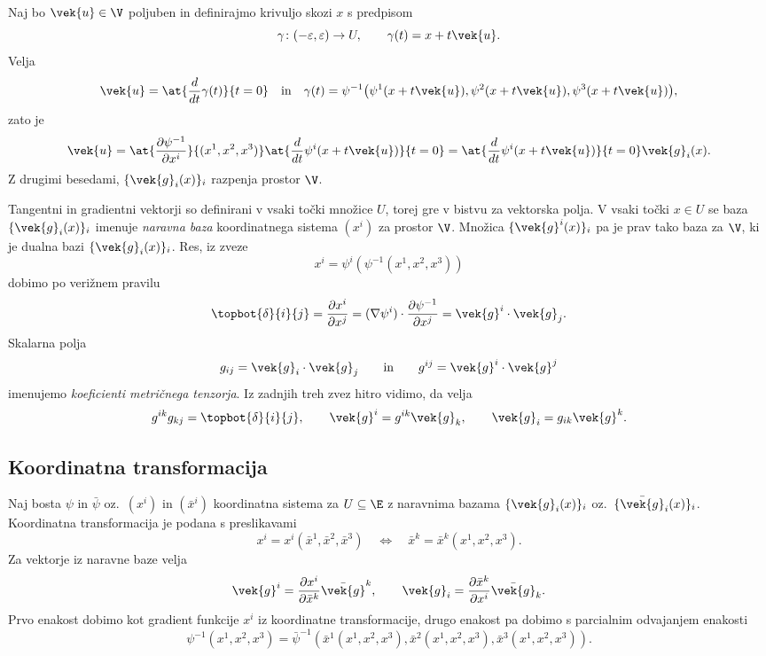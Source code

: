 \proof
	Naj bo $\vek{u}\in\V$ poljuben in definirajmo krivuljo skozi $x$ s predpisom
	\[ \gamma\colon(-\varepsilon,\varepsilon)\to U,\qquad \gamma(t)=x+t\vek{u}. \]
	Velja
	\[
		\vek{u}=\at{\frac{d}{dt}\gamma(t)}{t=0}\quad\textrm{in}\quad
		\gamma(t)=\psi^{-1}\big(\psi^1(x+t\vek{u}),\psi^2(x+t\vek{u}),\psi^3(x+t\vek{u})\big),
	\]
	zato je
	\[
		\vek{u}=
		\at{\frac{\partial\psi^{-1}}{\partial x^i}}{(x^1,x^2,x^3)}
		\at{\frac{d}{dt}\psi^i(x+t\vek{u})}{t=0}=
		\at{\frac{d}{dt}\psi^i(x+t\vek{u})}{t=0}\vek{g}_i(x).
	\]
	Z drugimi besedami, $\{\vek{g}_i(x)\}_{i}$ razpenja prostor $\V$.
\endproof

Tangentni in gradientni vektorji so definirani v vsaki točki množice $U$, torej
gre v bistvu za vektorska polja. V vsaki točki $x\in U$ se baza $\{\vek{g}_i(x)\}_i$
imenuje \emph{naravna baza} koordinatnega sistema $(x^i)$ za prostor $\V$.
Množica $\{\vek{g}^i(x)\}_i$ pa je prav tako baza za $\V$, ki je dualna bazi $\{\vek{g}_i(x)\}_i$.
Res, iz zveze
\[ x^i=\psi^i(\psi^{-1}(x^1,x^2,x^3)) \]
dobimo po verižnem pravilu
\begin{equation} \label{e:gigj}
	\topbot{\delta}{i}{j}=\frac{\partial x^i}{\partial x^j}=
	(\nabla\psi^i)\cdot\frac{\partial\psi^{-1}}{\partial x^j}=\vek{g}^i\cdot\vek{g}_j.
\end{equation}
Skalarna polja
\[ g_{ij}=\vek{g}_i\cdot\vek{g}_j\qquad\textrm{in}\qquad g^{ij}=\vek{g}^i\cdot\vek{g}^j \]
imenujemo \emph{koeficienti metričnega tenzorja}. 
Iz zadnjih treh zvez hitro vidimo, da velja
\begin{equation} \label{e:relzag}
	g^{ik}g_{kj}=\topbot{\delta}{i}{j},\qquad \vek{g}^i=g^{ik}\vek{g}_k,\qquad \vek{g}_i=g_{ik}\vek{g}^k.
\end{equation}


\subsection{Koordinatna transformacija}


Naj bosta $\psi$ in $\bar{\psi}$ oz.~$(x^i)$ in $(\bar{x}^i)$ koordinatna sistema za
$U\subseteq\E$ z naravnima bazama $\{\vek{g}_i(x)\}_i$ oz.~$\{\bar{\vek{g}}_i(x)\}_i$.
Koordinatna transformacija je podana s preslikavami
\[
	x^i=x^i(\bar{x}^1,\bar{x}^2,\bar{x}^3)\quad\Longleftrightarrow\quad
	\bar{x}^k=\bar{x}^k(x^1,x^2,x^3).
\]
Za vektorje iz naravne baze velja
\begin{equation} \label{e:gtog}
	\vek{g}^i=\frac{\partial x^i}{\partial\bar{x}^k}\bar{\vek{g}}^k,\qquad
	\vek{g}_i=\frac{\partial\bar{x}^k}{\partial x^i}\bar{\vek{g}}_k.
\end{equation}
Prvo enakost dobimo kot gradient funkcije $x^i$ iz koordinatne transformacije,
drugo enakost pa dobimo s parcialnim odvajanjem enakosti
\[ 
	\psi^{-1}(x^1,x^2,x^3)=\bar{\psi}^{-1}(\bar{x}^1(x^1,x^2,x^3),
	\bar{x}^2(x^1,x^2,x^3),\bar{x}^3(x^1,x^2,x^3)).
\]

